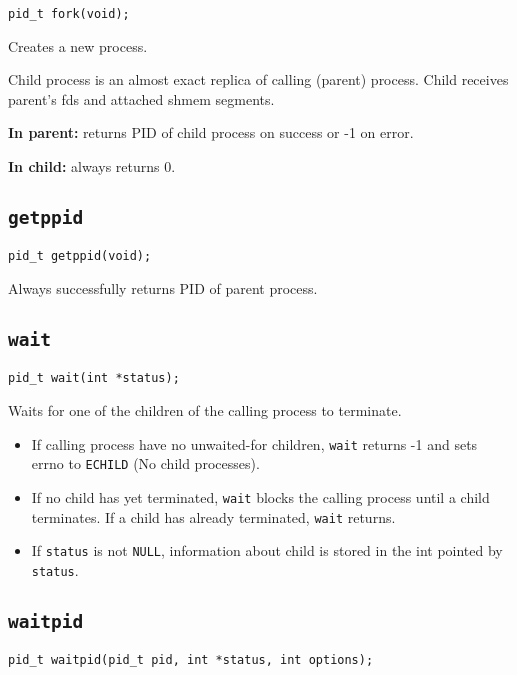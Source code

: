 \documentclass{article}
\begin{document}
\begin{verbatim}
pid_t fork(void);
\end{verbatim}

Creates a new process.

Child process is an almost exact replica of calling (parent) process. Child receives parent's fds and attached shmem segments.

\textbf{In parent:} returns PID of child process on success or -1 on error.

\textbf{In child:} always returns 0.


\subsection{\texttt{getppid}}

\begin{verbatim}
pid_t getppid(void);
\end{verbatim}

Always successfully returns PID of parent process.


\subsection{\texttt{wait}}

\begin{verbatim}
pid_t wait(int *status);
\end{verbatim}

Waits for one of the children of the calling process to terminate.

\begin{itemize}
    \item If calling process have no unwaited-for children, \texttt{wait} returns -1 and sets errno to \texttt{ECHILD} (No child processes).
    \item If no child has yet terminated, \texttt{wait} blocks the calling process until a child terminates. If a child has already terminated, \texttt{wait} returns.
    \item If \texttt{status} is not \texttt{NULL}, information about child is stored in the int pointed by \texttt{status}.
\end{itemize}


\subsection{\texttt{waitpid}}

\begin{verbatim}
pid_t waitpid(pid_t pid, int *status, int options);
\end{verbatim}
\end{document}

